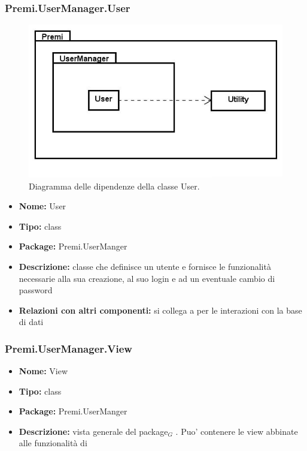 \subsubsection{Premi.UserManager.User}
\begin{figure}[h]
\begin{center}
\includegraphics[scale=0.45]{img/diapkg/vecchi/Utility_UserManager.jpg}
\caption{Diagramma delle dipendenze della classe User.}
\end{center}
\end{figure}
\begin{itemize}
  \item \textbf{Nome:} User
  \item \textbf{Tipo:} class
  \item \textbf{Package:} Premi.UserManger
  \item \textbf{Descrizione:} classe che definisce un utente e fornisce le funzionalità necessarie alla sua creazione, al suo login e ad un eventuale cambio di password
  \item \textbf{Relazioni con altri componenti:} si collega a  per le interazioni con la base di dati
\end{itemize}

\subsubsection{Premi.UserManager.View}
\begin{itemize}
  \item \textbf{Nome:} View
  \item \textbf{Tipo:} class
  \item \textbf{Package:} Premi.UserManger
  \item \textbf{Descrizione:} vista generale del package$_G$ . Puo' contenere le view abbinate alle funzionalità di 
\end{itemize}
